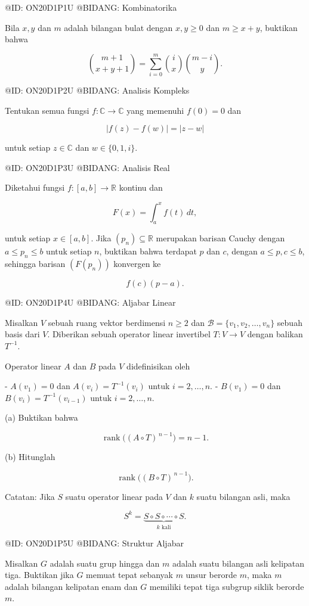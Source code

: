 @ID: ON20D1P1U
@BIDANG: Kombinatorika

Bila $x, y$ dan $m$ adalah bilangan bulat dengan $x,y\ge0$ dan $m\ge x+y$, buktikan bahwa

$$
\binom{m+1}{x+y+1}
=
\sum_{i=0}^{m}
\binom{i}{x}
\binom{m-i}{y}.
$$

@ID: ON20D1P2U
@BIDANG: Analisis Kompleks

Tentukan semua fungsi $f:\mathbb C\rightarrow\mathbb C$ yang memenuhi $f(0)=0$ dan

$$
|f(z)-f(w)|=|z-w|
$$

untuk setiap $z\in\mathbb C$ dan $w\in\{0,1,i\}$.

@ID: ON20D1P3U
@BIDANG: Analisis Real

Diketahui fungsi $f:[a,b]\rightarrow\mathbb R$ kontinu dan

$$
F(x)=\int_a^x f(t)\,dt,
$$

untuk setiap $x\in[a,b]$. Jika $(p_n)\subseteq\mathbb R$ merupakan barisan Cauchy dengan $a\le p_n\le b$ untuk setiap $n$, buktikan bahwa terdapat $p$ dan $c$, dengan $a\le p,c\le b$, sehingga barisan $(F(p_n))$ konvergen ke

$$
f(c)(p-a).
$$

@ID: ON20D1P4U
@BIDANG: Aljabar Linear

Misalkan $V$ sebuah ruang vektor berdimensi $n\ge2$ dan $\mathcal B=\{v_1,v_2,\dots,v_n\}$ sebuah basis dari $V$. Diberikan sebuah operator linear invertibel $T:V\rightarrow V$ dengan balikan $T^{-1}$.

Operator linear $A$ dan $B$ pada $V$ didefinisikan oleh

- $A(v_1)=0$ dan $A(v_i)=T^{-1}(v_i)$ untuk $i=2,\dots,n$.
- $B(v_1)=0$ dan $B(v_i)=T^{-1}(v_{i-1})$ untuk $i=2,\dots,n$.

(a) Buktikan bahwa

$$
\operatorname{rank}\big((A\circ T)^{\,n-1}\big)=n-1.
$$

(b) Hitunglah

$$
\operatorname{rank}\big((B\circ T)^{\,n-1}\big).
$$

Catatan: Jika $S$ suatu operator linear pada $V$ dan $k$ suatu bilangan asli, maka

$$
S^k=\underbrace{S\circ S\circ\cdots\circ S}_{k\text{ kali}}.
$$

@ID: ON20D1P5U
@BIDANG: Struktur Aljabar

Misalkan $G$ adalah suatu grup hingga dan $m$ adalah suatu bilangan asli kelipatan tiga. Buktikan jika $G$ memuat tepat sebanyak $m$ unsur berorde $m$, maka $m$ adalah bilangan kelipatan enam dan $G$ memiliki tepat tiga subgrup siklik berorde $m$.

